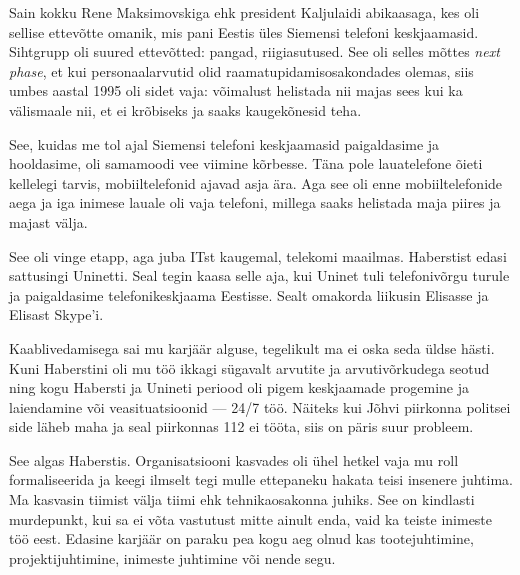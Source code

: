 Sain kokku Rene 
Maksimovskiga ehk president Kaljulaidi 
abikaasaga, kes oli sellise ettevõtte omanik, mis pani Eestis üles Siemensi 
telefoni keskjaamasid. Sihtgrupp oli suured ettevõtted: pangad, 
riigiasutused. See oli selles mõttes \emph{next phase}, et kui 
personaalarvutid olid raamatupidamisosakondades olemas, siis umbes aastal 1995 
oli sidet vaja: võimalust helistada nii 
majas sees kui ka välismaale nii, et ei krõbiseks ja saaks kaugekõnesid teha. 

See, kuidas me tol ajal Siemensi telefoni keskjaamasid paigaldasime ja hooldasime, 
oli samamoodi vee viimine kõrbesse. Täna pole lauatelefone 
õieti kellelegi tarvis, mobiiltelefonid ajavad asja ära. Aga see oli enne 
mobiiltelefonide aega ja iga inimese lauale oli vaja 
telefoni, millega saaks helistada maja piires ja majast välja. 


See oli vinge etapp, aga juba ITst kaugemal, telekomi maailmas. Haberstist 
edasi sattusingi Uninetti. Seal tegin kaasa selle aja, 
kui Uninet tuli telefonivõrgu turule ja paigaldasime telefonikeskjaama 
Eestisse. Sealt omakorda liikusin Elisasse ja Elisast Skype'i. 


Kaablivedamisega sai mu karjäär alguse, 
tegelikult ma ei oska seda üldse hästi. Kuni Haberstini oli mu töö
ikkagi sügavalt arvutite ja arvutivõrkudega seotud ning kogu Habersti ja 
Unineti periood oli pigem keskjaamade progemine ja laiendamine või 
veasituatsioonid --- 24/7 töö. Näiteks kui Jõhvi piirkonna politsei side läheb maha ja seal piirkonnas 112 ei tööta, siis on päris suur 
probleem. 


See algas Haberstis. Organisatsiooni kasvades oli ühel hetkel vaja 
mu roll formaliseerida ja keegi ilmselt tegi mulle ettepaneku hakata teisi insenere juhtima. Ma 
kasvasin tiimist välja tiimi ehk tehnikaosakonna juhiks. See on kindlasti murdepunkt, kui sa ei
võta vastutust mitte ainult enda, vaid ka teiste 
inimeste töö eest. Edasine karjäär on paraku pea kogu aeg 
olnud kas tootejuhtimine, projektijuhtimine, inimeste juhtimine või 
nende segu. 

